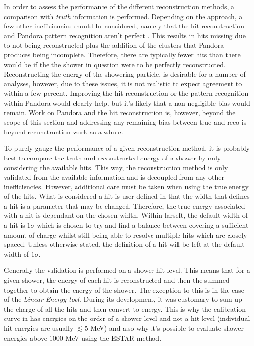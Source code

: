 In order to assess the performance of the different reconstruction methods, a comparison with \textit{truth} information is performed. Depending on the approach, a few other inefficiencies should be considered, namely that the hit reconstruction and Pandora pattern recognition aren't perfect \cite{Pandora_paper}. This results in hits missing due to not being reconstructed plus the addition of the clusters that Pandora produces being incomplete. Therefore, there are typically fewer hits than there would be if the the shower in question were to be perfectly reconstructed. Reconstructing the energy of the showering particle, is desirable for a number of analyses, however, due to these issues, it is not realistic to expect agreement to within a few percent. Improving the hit reconstruction or the pattern recognition within Pandora would clearly help, but it's likely that a non-negligible bias would remain. Work on Pandora and the hit reconstruction is, however, beyond the scope of this section and addressing any remaining bias between true and reco is beyond reconstruction work as a whole. 

To purely gauge the performance of a given reconstruction method, it is probably best to compare the truth and reconstructed energy of a shower by only considering the available hits. This way, the reconstruction method is only validated from the available information and is decoupled from any other inefficiencies. However, additional care must be taken when using the true energy of the hits. What is considered a hit is user defined in that the width that defines a hit is a parameter that may be changed. Therefore, the true energy associated with a hit is dependant on the chosen width. Within \gls{larsoft}, the default width of a hit is $1\sigma$ which is chosen to try and find a balance between covering a sufficient amount of charge whilst still being able to resolve multiple hits which are closely spaced. Unless otherwise stated, the definition of a hit will be left at the default width of $1\sigma$. 

Generally the validation is performed on a shower-hit level. This means that for a given shower, the energy of each hit is reconstructed and then the summed together to obtain the energy of the shower. The exception to this is in the case of the \textit{Linear Energy tool}. During its development, it was customary to sum up the charge of all the hits and then convert to energy. This is why the calibration curve in  has energies on the order of a shower level and not a hit level (individual hit energies are usually $\lesssim 5$ MeV) and also why it's possible to evaluate shower energies above 1000 MeV using the ESTAR method. 

